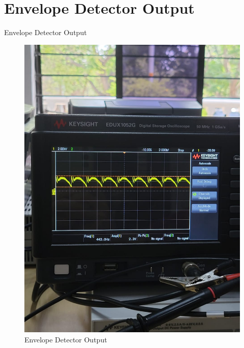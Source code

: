 \documentclass[10pt,xcolor={table,dvipsnames},t]{beamer}
\begin{document}
\section{Envelope Detector Output}
\begin{frame}{Envelope Detector Output}
\begin{figure}
    \centering
    \includegraphics[height=0.8\textwidth]{envelopeoutput.jpeg}
    \caption{Envelope Detector Output}
\end{figure}

\end{frame}
\end{document}
